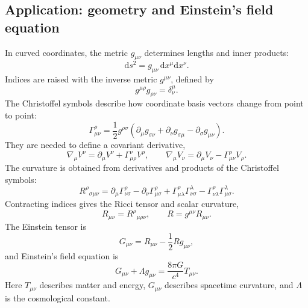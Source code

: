 \subsection{Application: geometry and Einstein's field equation}
In curved coordinates, the metric $g_{\mu\nu}$ determines lengths and inner products:
\begin{equation}
\mathrm{d}s^2=g_{\mu\nu}\,\mathrm{d}x^\mu\mathrm{d}x^\nu.
\end{equation}
Indices are raised with the inverse metric $g^{\mu\nu}$, defined by
\begin{equation}
g^{\mu\rho}g_{\rho\nu}=\delta^\mu_{\nu}.
\end{equation}
The Christoffel symbols describe how coordinate basis vectors change from point to point:
\begin{equation}
\Gamma^{\rho}_{\mu\nu}
=\frac12g^{\rho\sigma}
\left(\partial_\mu g_{\sigma\nu}
+\partial_\nu g_{\sigma\mu}
-\partial_\sigma g_{\mu\nu}\right).
\end{equation}
They are needed to define a covariant derivative,
\begin{equation}
\nabla_\mu V^\nu=\partial_\mu V^\nu+\Gamma^\nu_{\mu\rho}V^\rho,
\qquad
\nabla_\mu V_\nu=\partial_\mu V_\nu-\Gamma^\rho_{\mu\nu}V_\rho.
\end{equation}
The curvature is obtained from derivatives and products of the Christoffel symbols:
\begin{equation}
R^\rho{}_{\sigma\mu\nu}
=\partial_\mu\Gamma^\rho_{\nu\sigma}
-\partial_\nu\Gamma^\rho_{\mu\sigma}
+\Gamma^\rho_{\mu\lambda}\Gamma^\lambda_{\nu\sigma}
-\Gamma^\rho_{\nu\lambda}\Gamma^\lambda_{\mu\sigma}.
\end{equation}
Contracting indices gives the Ricci tensor and scalar curvature,
\begin{equation}
R_{\mu\nu}=R^\rho{}_{\mu\rho\nu},
\qquad
R=g^{\mu\nu}R_{\mu\nu}.
\end{equation}
The Einstein tensor is
\begin{equation}
G_{\mu\nu}=R_{\mu\nu}-\frac12Rg_{\mu\nu},
\end{equation}
and Einstein's field equation is
\begin{equation}
G_{\mu\nu}+\Lambda g_{\mu\nu}
=\frac{8\pi G}{c^4}T_{\mu\nu}.
\end{equation}
Here $T_{\mu\nu}$ describes matter and energy, $G_{\mu\nu}$ describes spacetime curvature, and $\Lambda$ is the cosmological constant.

